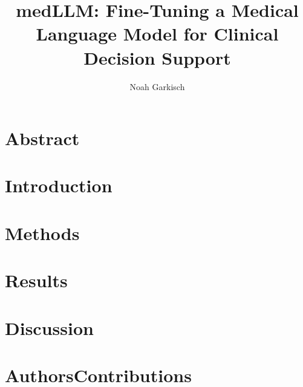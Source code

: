 \documentclass[a4paper,12pt]{article}
\begin{document}
\title{medLLM: Fine-Tuning a Medical Language Model for Clinical Decision Support}
\author{Noah Garkisch}

\section{Abstract}


\section{Introduction}


\section{Methods}


\section{Results}


\section{Discussion}


\printbibliography

\section{AuthorsContributions}

\end{document}
